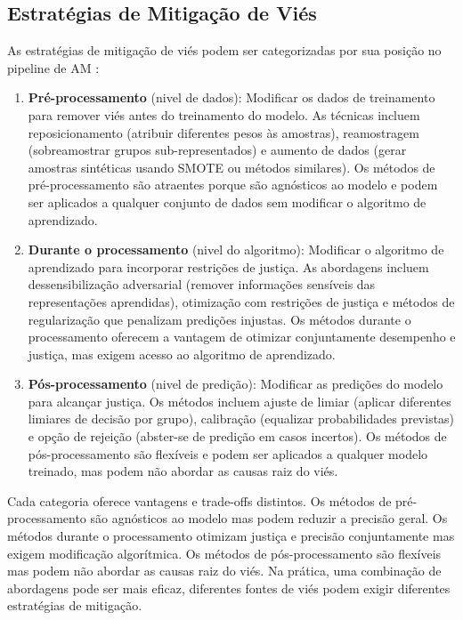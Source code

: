 \subsection{Estratégias de Mitigação de Viés}

As estratégias de mitigação de viés podem ser categorizadas por sua posição 
no pipeline de AM \cite{friedler2019}:

\begin{enumerate}[leftmargin=*]
    \item \textbf{Pré-processamento} (nivel de dados): Modificar os dados 
          de treinamento para remover viés antes do treinamento do modelo. 
          As técnicas incluem reposicionamento (atribuir diferentes pesos 
          às amostras), reamostragem (sobreamostrar grupos sub-representados) 
          e aumento de dados (gerar amostras sintéticas usando SMOTE ou 
          métodos similares). Os métodos de pré-processamento são atraentes 
          porque são agnósticos ao modelo e podem ser aplicados a qualquer 
          conjunto de dados sem modificar o algoritmo de aprendizado.
    
    \item \textbf{Durante o processamento} (nivel do algoritmo): Modificar 
          o algoritmo de aprendizado para incorporar restrições de justiça. 
          As abordagens incluem dessensibilização adversarial (remover 
          informações sensíveis das representações aprendidas), otimização 
          com restrições de justiça e métodos de regularização que penalizam 
          predições injustas. Os métodos durante o processamento oferecem a 
          vantagem de otimizar conjuntamente desempenho e justiça, mas 
          exigem acesso ao algoritmo de aprendizado.
    
    \item \textbf{Pós-processamento} (nivel de predição): Modificar as 
          predições do modelo para alcançar justiça. Os métodos incluem 
          ajuste de limiar (aplicar diferentes limiares de decisão por grupo), 
          calibração (equalizar probabilidades previstas) e opção de rejeição 
          (abster-se de predição em casos incertos). Os métodos de 
          pós-processamento são flexíveis e podem ser aplicados a qualquer 
          modelo treinado, mas podem não abordar as causas raiz do viés.
\end{enumerate}

Cada categoria oferece vantagens e trade-offs distintos. Os métodos de 
pré-processamento são agnósticos ao modelo mas podem reduzir a precisão 
geral. Os métodos durante o processamento otimizam justiça e precisão 
conjuntamente mas exigem modificação algorítmica. Os métodos de 
pós-processamento são flexíveis mas podem não abordar as causas raiz do 
viés. Na prática, uma combinação de abordagens pode ser mais eficaz, 
diferentes fontes de viés podem exigir diferentes estratégias de mitigação.

